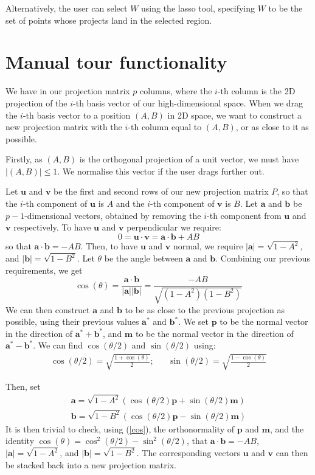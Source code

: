 \documentclass{article}
\renewcommand{\v}[1]{\boldsymbol{#1}}
\begin{document}
Alternatively, the user can select $W$ using the lasso tool, specifying $W$ to be the set of points whose projects land in the selected region.

\section{Manual tour functionality}
We have in our projection matrix $p$ columns, where the $i$-th column is the 2D projection of the $i$-th basis vector of our high-dimensional space. When we drag the $i$-th basis vector to a position $(A, B)$ in 2D space, we want to construct a new projection matrix with the $i$-th column equal to $(A, B)$, or as close to it as possible. 

Firstly, as $(A, B)$ is the orthogonal projection of a unit vector, we must have $|(A, B)| \le 1$. We normalise this vector if the user drags further out. 

Let $\v{u}$ and $\v{v}$ be the first and second rows of our new projection matrix $P$, so that the $i$-th component of $\v{u}$ is $A$ and the $i$-th component of $\v{v}$ is $B$. Let $\v{a}$ and $\v{b}$ be $p-1$-dimensional vectors, obtained by removing the $i$-th component from $\v{u}$ and $\v{v}$ respectively. To have $\v{u}$ and $\v{v}$ perpendicular we require:
\[
0 = \v{u}\cdot \v{v} = \v{a} \cdot \v{b} + AB
\]
so that $\v{a} \cdot \v{b} = -AB$. Then, to have $\v{u}$ and $\v{v}$ normal, we require $|\v{a}| = \sqrt{1 - A^2}$, and $|\v{b}| = \sqrt{1 - B^2}$. Let $\theta$ be the angle between $\v{a}$ and $\v{b}$. Combining our previous requirements, we get 
\begin{equation} \label{cos}
\cos(\theta) = \frac{\v{a}\cdot \v{b}}{|\v{a}||\v{b}|} = \frac{-AB}{\sqrt{(1 - A^2)(1 - B^2)}}
\end{equation}
We can then construct $\v{a}$ and $\v{b}$ to be as close to the previous projection as possible, using their previous values $\v{a^*}$ and $\v{b^*}$. We set $\v{p}$ to be the normal vector in the direction of $\v{a^*}+\v{b^*}$, and $\v{m}$ to be the normal vector in the direction of $\v{a^*} - \v{b^*}$. We can find $\cos(\theta/2)$ and $\sin(\theta/2)$ using:
\begin{align*}
    \cos(\theta/2) = \sqrt{\frac{1 + \cos(\theta)}{2}}; & & \sin(\theta/2) = \sqrt{\frac{1 - \cos(\theta)}{2}}
\end{align*}

Then, set
\begin{align*}
    \v{a} = \sqrt{1 - A^2}(\cos(\theta/2) \v{p} + \sin(\theta/2) \v{m})\\
    \v{b} = \sqrt{1 - B^2}(\cos(\theta/2) \v{p} - \sin(\theta/2) \v{m})
\end{align*}
It is then trivial to check, using (\ref{cos}), the orthonormality of $\v{p}$ and $\v{m}$, and the identity $\cos(\theta) = \cos^2(\theta/2) - \sin^2(\theta/2)$, that $\v{a} \cdot \v{b} = -AB$, $|\v{a}| = \sqrt{1 - A^2}$, and $|\v{b}| = \sqrt{1 - B^2}$. The corresponding vectors $\v{u}$ and $\v{v}$ can then be stacked back into a new projection matrix.
\end{document}
